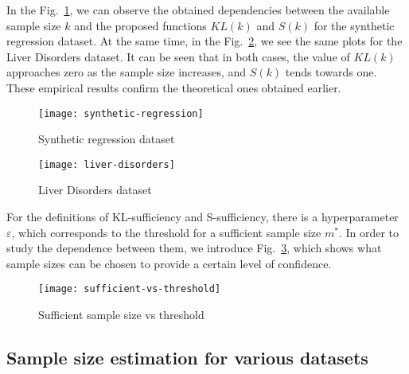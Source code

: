\documentclass[sn-mathphys-num]{sn-jnl}%
\begin{document}
In the Fig.~\ref{synthetic-regression}, we can observe the obtained dependencies between the available sample size $k$ and the proposed functions $KL(k)$ and $S(k)$ for the synthetic regression dataset. At the same time, in the Fig.~\ref{liver-disorders}, we see the same plots for the Liver Disorders dataset. It can be seen that in both cases, the value of $KL(k)$ approaches zero as the sample size increases, and $S(k)$ tends towards one. These empirical results confirm the theoretical ones obtained earlier.

\begin{figure}[ht]
    \centering
    \texttt{[image: synthetic-regression]}
    \caption{Synthetic regression dataset}
    \label{synthetic-regression}
\end{figure}

\begin{figure}[ht]
    \centering
    \texttt{[image: liver-disorders]}
    \caption{Liver Disorders dataset}
    \label{liver-disorders}
\end{figure}

For the definitions of KL-sufficiency and S-sufficiency, there is a hyperparameter $\varepsilon$, which corresponds to the threshold for a sufficient sample size $m^*$. In order to study the dependence between them, we introduce Fig.~\ref{sufficient-vs-threshold}, which shows what sample sizes can be chosen to provide a certain level of confidence.

\begin{figure}[ht]
    \centering
    \texttt{[image: sufficient-vs-threshold]}
    \caption{Sufficient sample size vs threshold}
    \label{sufficient-vs-threshold}
\end{figure}

\subsection{Sample size estimation for various datasets}
\end{document}
